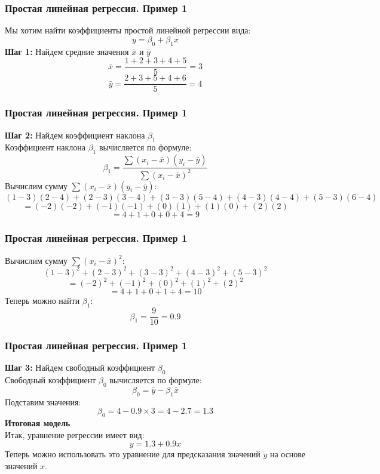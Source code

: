 \documentclass[aspectratio=169]{beamer}
\begin{document}
\begin{frame}
\frametitle{Простая линейная регрессия. Пример 1}
Мы хотим найти коэффициенты простой линейной регрессии вида:
\[
y = \beta_0 + \beta_1 x
\]
{\bf Шаг 1:} Найдем средние значения \( \bar{x} \) и \( \bar{y} \)
\[
\bar{x} = \frac{1 + 2 + 3 + 4 + 5}{5} = 3
\]
\[
\bar{y} = \frac{2 + 3 + 5 + 4 + 6}{5} = 4
\]
\end{frame}

\begin{frame}
\frametitle{Простая линейная регрессия. Пример 1}
{\bf Шаг 2:} Найдем коэффициент наклона \( \beta_1 \)\\
Коэффициент наклона \( \beta_1 \) вычисляется по формуле:
\[
\beta_1 = \frac{\sum (x_i - \bar{x})(y_i - \bar{y})}{\sum (x_i - \bar{x})^2}
\]
Вычислим сумму \( \sum (x_i - \bar{x})(y_i - \bar{y}) \):
  \[
  (1 - 3)(2 - 4) + (2 - 3)(3 - 4) + (3 - 3)(5 - 4) + (4 - 3)(4 - 4) + (5 - 3)(6 - 4)
  \]
  \[
  = (-2)(-2) + (-1)(-1) + (0)(1) + (1)(0) + (2)(2)
  \]
  \[
  = 4 + 1 + 0 + 0 + 4 = 9
  \]
\end{frame}

\begin{frame}
\frametitle{Простая линейная регрессия. Пример 1}
Вычислим сумму \( \sum (x_i - \bar{x})^2 \):\\
  \[
  (1 - 3)^2 + (2 - 3)^2 + (3 - 3)^2 + (4 - 3)^2 + (5 - 3)^2
  \]
  \[
  = (-2)^2 + (-1)^2 + (0)^2 + (1)^2 + (2)^2
  \]
  \[
  = 4 + 1 + 0 + 1 + 4 = 10
  \]
Теперь можно найти \( \beta_1 \):
\[
\beta_1 = \frac{9}{10} = 0.9
\]
\end{frame}

\begin{frame}
\frametitle{Простая линейная регрессия. Пример 1}
{\bf Шаг 3:} Найдем свободный коэффициент \( \beta_0 \)\\
Свободный коэффициент \( \beta_0 \) вычисляется по формуле:
\[
\beta_0 = \bar{y} - \beta_1 \bar{x}
\]
Подставим значения:
\[
\beta_0 = 4 - 0.9 \times 3 = 4 - 2.7 = 1.3
\]
{\bf Итоговая модель}\\
Итак, уравнение регрессии имеет вид:
\[
y = 1.3 + 0.9x
\]
Теперь можно использовать это уравнение для предсказания значений \( y \) на основе значений \( x \).
\end{frame}
\end{document}
